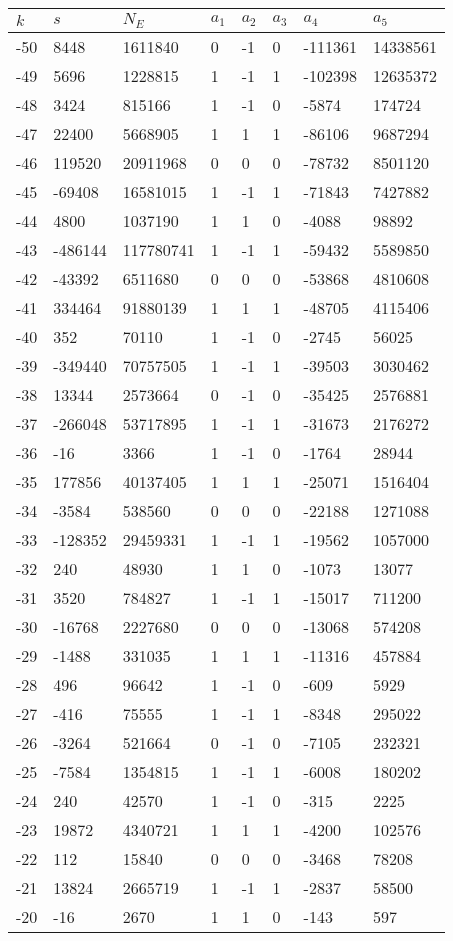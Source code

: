 \documentclass{amsart}
\begin{document}
\begin{longtable}{|l|l|l|lllll|}
\hline
$k$ & $s$ & $N_E$ & $a_1$ & $a_2$ & $a_3$ & $a_4$ & $a_5$\\
\hline
-50&8448&1611840&0&-1&0&-111361&14338561\\
-49&5696&1228815&1&-1&1&-102398&12635372\\
-48&3424&815166&1&-1&0&-5874&174724\\
-47&22400&5668905&1&1&1&-86106&9687294\\
-46&119520&20911968&0&0&0&-78732&8501120\\
-45&-69408&16581015&1&-1&1&-71843&7427882\\
-44&4800&1037190&1&1&0&-4088&98892\\
-43&-486144&117780741&1&-1&1&-59432&5589850\\
-42&-43392&6511680&0&0&0&-53868&4810608\\
-41&334464&91880139&1&1&1&-48705&4115406\\
-40&352&70110&1&-1&0&-2745&56025\\
-39&-349440&70757505&1&-1&1&-39503&3030462\\
-38&13344&2573664&0&-1&0&-35425&2576881\\
-37&-266048&53717895&1&-1&1&-31673&2176272\\
-36&-16&3366&1&-1&0&-1764&28944\\
-35&177856&40137405&1&1&1&-25071&1516404\\
-34&-3584&538560&0&0&0&-22188&1271088\\
-33&-128352&29459331&1&-1&1&-19562&1057000\\
-32&240&48930&1&1&0&-1073&13077\\
-31&3520&784827&1&-1&1&-15017&711200\\
-30&-16768&2227680&0&0&0&-13068&574208\\
-29&-1488&331035&1&1&1&-11316&457884\\
-28&496&96642&1&-1&0&-609&5929\\
-27&-416&75555&1&-1&1&-8348&295022\\
-26&-3264&521664&0&-1&0&-7105&232321\\
-25&-7584&1354815&1&-1&1&-6008&180202\\
-24&240&42570&1&-1&0&-315&2225\\
-23&19872&4340721&1&1&1&-4200&102576\\
-22&112&15840&0&0&0&-3468&78208\\
-21&13824&2665719&1&-1&1&-2837&58500\\
-20&-16&2670&1&1&0&-143&597\\

\end{longtable}
\end{document}
